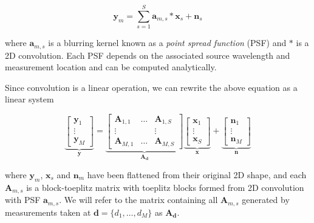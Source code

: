 \documentclass{article}
\begin{document}
\begin{equation}
\bm{y}_m = \sum_{s=1}^S \bm{a}_{m,s} \ast \bm{x}_s + \bm{n}_s
\label{eq:fwd_model}
\end{equation}

where $\bm{a}_{m,s}$ is a blurring kernel known as a \emph{point spread
function} (PSF) and $\ast$ is a 2D convolution. Each PSF depends on the
associated source wavelength and measurement location and can be computed
analytically.

Since convolution is a linear operation, we can rewrite the above equation as a
linear system

\begin{equation}
  \underbrace{
    \begin{bmatrix}\bm{y}_1 \\ \vdots \\ \bm{y}_M\end{bmatrix}
  }_{\bm{y}}
  =
  \underbrace{
    \begin{bmatrix}
      \bm{A}_{1, 1} & \hdots & \bm{A}_{1, S} \\
      \vdots & & \vdots \\
      \bm{A}_{M, 1} & \hdots & \bm{A}_{M, S}
    \end{bmatrix}
  }_{\bm{A}_{\bm{d}}}
  \underbrace{
    \begin{bmatrix}\bm{x}_1 \\ \vdots \\ \bm{x}_S\end{bmatrix}
  }_{\bm{x}}
  +
  \underbrace{
    \begin{bmatrix}\bm{n}_1 \\ \vdots \\ \bm{n}_M\end{bmatrix}
  }_{\bm{n}}
\label{eq:fourier_mtx}
\end{equation}


where $\bm{y}_m$, $\bm{x}_s$ and $\bm{n}_m$ have been flattened from their
original 2D shape, and each $\bm{A}_{m,s}$ is a block-toeplitz
matrix with toeplitz blocks formed from 2D convolution with PSF $\bm{a}_{m,s}$.
We will refer to the matrix containing all $\bm{A}_{m,s}$
generated by measurements taken at $\bm{d} = \{d_1, \dots, d_M\}$ as
$\bm{A}_{\bm{d}}$.
\end{document}
